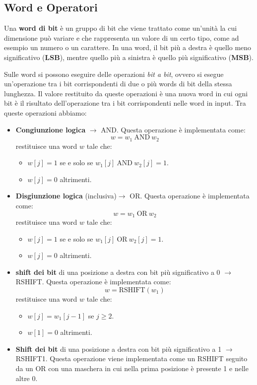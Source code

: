 \subsection{Word e Operatori}
\begin{definizione}
    Una \textbf{word di bit} è un gruppo di bit che viene trattato come un'unità la cui dimensione può variare e che rappresenta un valore di un certo tipo, come ad esempio un numero o un carattere. In una word, il bit più a destra è quello meno significativo (\textbf{LSB}), mentre quello più a sinistra è quello più significativo (\textbf{MSB}).
\end{definizione}
Sulle word si possono eseguire delle operazioni \textit{bit a bit}, ovvero si esegue un'operazione tra i bit corrispondenti di due o più words di bit della stessa lunghezza. Il valore restituito da queste operazioni è una nuova word in cui ogni bit è il risultato dell'operazione tra i bit corrispondenti nelle word in input. Tra queste operazioni abbiamo:
\begin{itemize}
    \item \textbf{Congiunzione logica} $\to$ AND. Questa operazione è implementata come:
    \begin{equation}
        w = w_1 \ \text{AND} \ w_2
    \end{equation}
    restituisce una word $w$ tale che:
    \begin{itemize}
        \item $w[j] = 1$ se e solo se $w_1[j] \ \text{AND} \ w_2[j] =  1$.
        \item $w[j] = 0$ altrimenti.
    \end{itemize}
    \item \textbf{Disgiunzione logica} (inclusiva)$\to$ OR. Questa operazione è implementata come:
    \begin{equation}
        w = w_1 \ \text{OR} \ w_2
    \end{equation}
    restituisce una word $w$ tale che:
    \begin{itemize}
        \item $w[j] = 1$ se e solo se $w_1[j] \ \text{OR} \ w_2[j] =  1$.
        \item $w[j] = 0$ altrimenti.
    \end{itemize}
    \item \textbf{shift dei bit} di una posizione a destra con bit più significativo a 0 $\to$ RSHIFT. Questa operazione è implementata come:
    \begin{equation}
        w = \text{RSHIFT}(w_1)
    \end{equation}
    restituisce una word $w$ tale che:
    \begin{itemize}
        \item $w[j] = w_1[j - 1]$ se $j \geq 2$.
        \item $w[1] = 0$ altrimenti.
    \end{itemize}
    \item \textbf{Shift dei bit} di una posizione a destra con bit più significativo a 1 $\to$ RSHIFT1. Questa operazione viene implementata come un RSHIFT seguito da un OR con una maschera in cui nella prima posizione è presente 1 e nelle altre 0.
\end{itemize}
